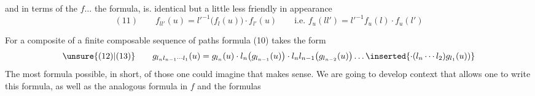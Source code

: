 and in terms of the $f\ldots$ the formula, is. identical but a little less friendly in appearance
\[
(11)\qquad f_{ll'}(u)=l'^{-1}\bigl(f_l(u)\bigr)\cdot f_{l'}(u)
\qquad\text{i.e. }f_u(ll')=l'^{-1}f_u(l)\cdot f_u(l')
\]


For a composite of a  finite composable sequence of paths
formula (10) takes the form
\[
\unsure{(12)|(13)}\qquad
 g_{l_nl_{n-1}\cdots l_1}(u)=g_{l_n}(u)\cdot l_n\bigl(g_{l_{n-1}}(u)\bigr)\cdot l_nl_{n-1}\bigl(g_{l_{n-2}}(u)\bigr)\ldots
 \inserted{\cdot(l_n\cdots l_2)g_{l_1}(u))}
\]
The most   formula possible, in short, of those one could imagine that makes sense. We are going to develop   context that allows one  to write this formula, as well as  the analogous formula in $f$ and the formulas
